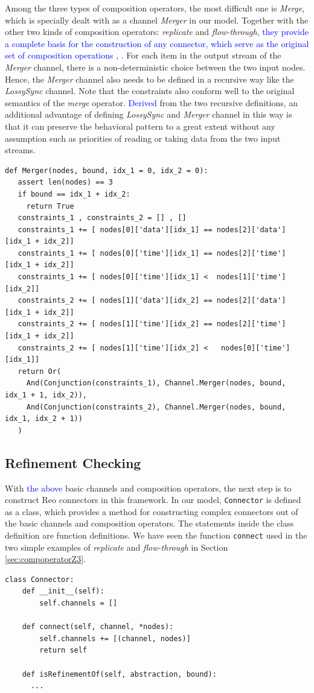 \documentclass[preprint,3p]{elsarticle}
\newcommand{\liyi}[1]{\textcolor{blue}{#1}}
\newcommand{\xy}[1]{{#1}}
\begin{document}
Among the three types of composition operators, the most difficult one is \emph{Merge}, which is specially dealt with as a channel \emph{Merger} in our model. Together with the other two kinds of composition operators: \emph{replicate} and \emph{flow-through}, \liyi{they provide a complete basis for the construction of any connector, which serve as the original set of composition operations \cite{Arb04}, \cite{SAA+12}.} For each item in the output stream of the \emph{Merger} channel, there is a non-deterministic choice between the two input nodes. Hence, the \emph{Merger} channel also needs to be defined in a recursive way like the \emph{LossySync} channel. Note that the constraints also conform well to the original semantics of the \emph{merge} operator. \liyi{Derived} from the two recursive definitions, an additional advantage of defining \emph{LossySync} and \emph{Merger} channel in this way is that it can preserve the behavioral pattern to a great extent without any assumption such as priorities of reading or taking data from the two input streams.
\begin{lstlisting}
def Merger(nodes, bound, idx_1 = 0, idx_2 = 0):
   assert len(nodes) == 3
   if bound == idx_1 + idx_2:
     return True
   constraints_1 , constraints_2 = [] , []
   constraints_1 += [ nodes[0]['data'][idx_1] == nodes[2]['data'][idx_1 + idx_2]]
   constraints_1 += [ nodes[0]['time'][idx_1] == nodes[2]['time'][idx_1 + idx_2]]
   constraints_1 += [ nodes[0]['time'][idx_1] <  nodes[1]['time'][idx_2]]
   constraints_2 += [ nodes[1]['data'][idx_2] == nodes[2]['data'][idx_1 + idx_2]]
   constraints_2 += [ nodes[1]['time'][idx_2] == nodes[2]['time'][idx_1 + idx_2]]
   constraints_2 += [ nodes[1]['time'][idx_2] <   nodes[0]['time'][idx_1]]
   return Or(
     And(Conjunction(constraints_1), Channel.Merger(nodes, bound, idx_1 + 1, idx_2)),
     And(Conjunction(constraints_2), Channel.Merger(nodes, bound, idx_1, idx_2 + 1))
   )
\end{lstlisting}

\subsection{Refinement Checking}
\xy{With \liyi{the above} basic channels and composition operators,} the next step is to construct Reo connectors in this framework. In our model, \texttt{Connector} is defined as a class, which provides \xy{a method for constructing} complex connectors out of the basic channels and composition operators.
The statements inside the class definition are function definitions. We have seen the function \texttt{connect} used in the two simple examples of \emph{replicate} and \emph{flow-through} in Section \ref{sec:compoperatorZ3}.
\begin{lstlisting}
class Connector:
    def __init__(self):
        self.channels = []

    def connect(self, channel, *nodes):
        self.channels += [(channel, nodes)]
        return self

    def isRefinementOf(self, abstraction, bound):
      ...
\end{lstlisting}
\end{document}
